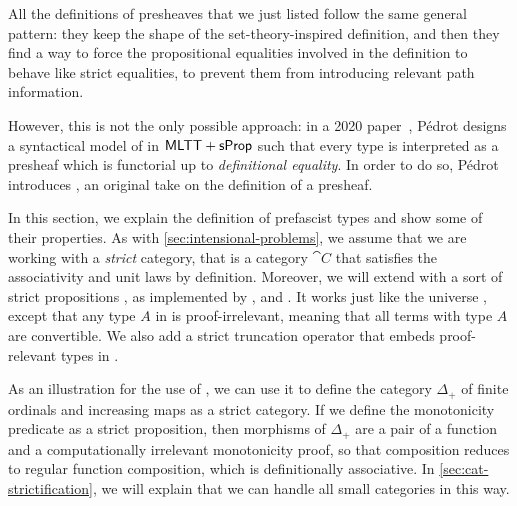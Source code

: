 All the definitions of presheaves that we just listed follow the same general
pattern: they keep the shape of the set-theory-inspired definition, and
then they find a way to force the propositional equalities involved in the
definition to behave like strict equalities, \ie to prevent them from 
introducing relevant path information. 

However, this is not the only possible approach: 
% 
in a 2020 paper~, Pédrot designs a syntactical model of \MLTT in
\( \mathsf{MLTT}+\mathsf{sProp} \) such that every type is interpreted as a presheaf which
is functorial up to \emph{definitional equality}. 
% 
In order to do so, Pédrot introduces , an original
take on the definition of a presheaf.

In this section, we explain the definition of prefascist types and show some of 
their properties.
% 
As with \cref{sec:intensional-problems}, we assume that we are working with a 
\emph{strict} category, that is a category \( \cat{C} \) that satisfies the 
associativity and unit laws by definition. 
% 
% 
Moreover, we will extend \MLTT with a sort of strict propositions ,
as implemented by \Coq, \Agda and \Lean \cite{gilbert:hal-01859964}.
% 
It works just like the universe , except that any type \( A \) 
in  is proof-irrelevant, meaning that all terms with type 
\( A \) are convertible.
% 
We also add a strict truncation operator  that embeds 
proof-relevant types in .

As an illustration for the use of , we can use it to define the category
\( \Delta_+ \) of finite ordinals and increasing maps as a strict category.
If we define the monotonicity predicate as a strict proposition, then 
morphisms of \( \Delta_+ \) are a pair of a function and a computationally
irrelevant monotonicity proof, so that composition reduces to regular function 
composition, which is definitionally associative.
% 
In \cref{sec:cat-strictification}, we will explain that we can handle all small
categories in this way.

